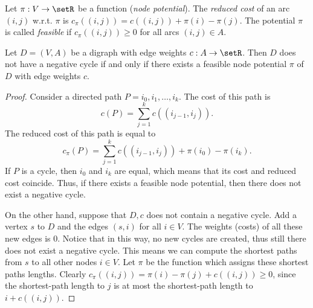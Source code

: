   
  
  


Let $\pi : V  \to \setR$ be a function (\emph{node potential}). The
\emph{reduced cost} of an arc $(i,j)$ w.r.t. $\pi$ is 
$c_\pi((i,j))=c((i,j))+\pi(i) - \pi(j)$. The potential $\pi$ is called
\emph{feasible} if $c_\pi((i,j))\geq0$ for all arcs $(i,j)\in A$. 

\begin{lemma}
  \label{lem:7}
  Let $D = (V,A)$ be a digraph with edge weights $c:A\to\setR$. Then $D$
  does not have a negative cycle if and only if there exists a
  feasible node potential $\pi$ of $D$ with edge weights $c$. 
\end{lemma}


\begin{proof}
  Consider a directed path $P = i_0,i_1,\ldots,i_k$. The cost of this
  path is 
  \begin{displaymath}
    c(P) = \sum_{j=1}^{k}c((i_{j-1},i_j)).
  \end{displaymath}
  The reduced cost of this path is equal to 
  \begin{displaymath}
    c_\pi(P) = \sum_{j=1}^{k}c((i_{j-1},i_j)) + \pi(i_0) - \pi(i_k).
  \end{displaymath}
  If $P$ is a cycle, then $i_0$ and $i_k$ are equal, which means that
  its cost and reduced cost coincide. Thus, if there exists a feasible
  node potential, then there does not exist a negative cycle. 

  
  On the other hand, suppose that $D,c$ does not contain a negative
  cycle. Add a vertex $s$ to $D$ and the edges $(s,i)$ for all 
  $i \in  V$. The weights (costs) of all these new edges is $0$. Notice
  that in this way, no new cycles are created, thus still there does
  not exist a negative cycle. This means we can compute the shortest
  paths from $s$ to all other nodes $i \in V$. Let $\pi$ be the function
  which assigns these shortest paths lengths. Clearly $c_\pi((i,j)) =
  \pi(i) - \pi(j) + c((i,j))\geq0$, since the shortest-path length to $j$ is
  at most the shortest-path length to $i + c((i,j))$. 
\end{proof}

